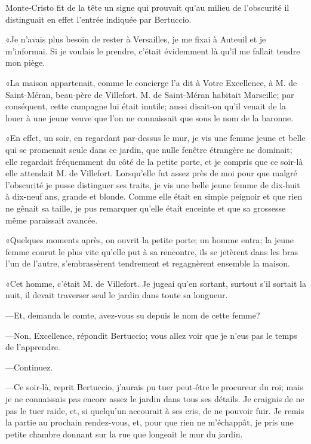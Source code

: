 Monte-Cristo fit de la tête un signe qui prouvait qu'au milieu de l'obscurité il distinguait en effet l'entrée indiquée par Bertuccio. 

«Je n'avais plus besoin de rester à Versailles, je me fixai à Auteuil et je m'informai. Si je voulais le prendre, c'était évidemment là qu'il me fallait tendre mon piège. 

«La maison appartenait, comme le concierge l'a dit à Votre Excellence, à M. de Saint-Méran, beau-père de Villefort. M. de Saint-Méran habitait Marseille; par conséquent, cette campagne lui était inutile; aussi disait-on qu'il venait de la louer à une jeune veuve que l'on ne connaissait que sous le nom de la baronne. 

«En effet, un soir, en regardant par-dessus le mur, je vis une femme jeune et belle qui se promenait seule dans ce jardin, que nulle fenêtre étrangère ne dominait; elle regardait fréquemment du côté de la petite porte, et je compris que ce soir-là elle attendait M. de Villefort. Lorsqu'elle fut assez près de moi pour que malgré l'obscurité je pusse distinguer ses traits, je vis une belle jeune femme de dix-huit à dix-neuf ans, grande et blonde. Comme elle était en simple peignoir et que rien ne gênait sa taille, je pus remarquer qu'elle était enceinte et que sa grossesse même paraissait avancée. 

«Quelques moments après, on ouvrit la petite porte; un homme entra; la jeune femme courut le plus vite qu'elle put à sa rencontre, ils se jetèrent dans les bras l'un de l'autre, s'embrassèrent tendrement et regagnèrent ensemble la maison. 

«Cet homme, c'était M. de Villefort. Je jugeai qu'en sortant, surtout s'il sortait la nuit, il devait traverser seul le jardin dans toute sa longueur. 

—Et, demanda le comte, avez-vous su depuis le nom de cette femme? 

—Non, Excellence, répondit Bertuccio; vous allez voir que je n'eus pas le temps de l'apprendre. 

—Continuez. 

—Ce soir-là, reprit Bertuccio, j'aurais pu tuer peut-être le procureur du roi; mais je ne connaissais pas encore assez le jardin dans tous ses détails. Je craignis de ne pas le tuer raide, et, si quelqu'un accourait à ses cris, de ne pouvoir fuir. Je remis la partie au prochain rendez-vous, et, pour que rien ne m'échappât, je pris une petite chambre donnant sur la rue que longeait le mur du jardin. 

